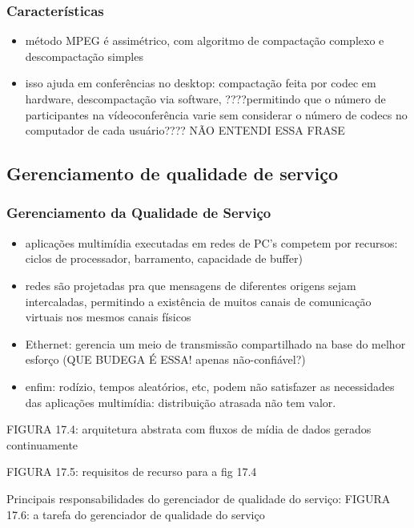 \documentclass[]{beamer}
\begin{document}
\begin{frame}
  \frametitle{Características}
\begin{itemize}
  \item método MPEG é assimétrico, com algoritmo de compactação complexo e descompactação
simples
  \item isso ajuda em conferências no desktop: compactação feita por codec em hardware, 
descompactação via software, ????permitindo que o número de participantes na
vídeoconferência varie sem considerar o número de 
codecs no computador de cada usuário???? NÃO ENTENDI ESSA FRASE
\end{itemize}
\end{frame}

\subsection{Gerenciamento de qualidade de serviço}

\begin{frame}
  \frametitle{Gerenciamento da Qualidade de Serviço}
\begin{itemize}
  \item aplicações multimídia executadas em redes de PC's competem por recursos: ciclos 
de processador, barramento, capacidade de buffer)
  \item redes são projetadas pra que mensagens de diferentes origens sejam intercaladas,
permitindo a existência de muitos canais de comunicação virtuais nos mesmos canais físicos
  \item Ethernet: gerencia um meio de transmissão compartilhado na base do melhor esforço
(QUE BUDEGA É ESSA! apenas não-confiável?)
  \item enfim: rodízio, tempos aleatórios, etc, podem não satisfazer as necessidades das
aplicações multimídia: distribuição atrasada não tem valor.
\end{itemize}
\end{frame}

\begin{frame}
FIGURA 17.4: arquitetura abstrata com fluxos de mídia de dados gerados continuamente
\end{frame}

\begin{frame}
FIGURA 17.5: requisitos de recurso para a fig 17.4
\end{frame}

\begin{frame}
Principais responsabilidades do gerenciador de qualidade do serviço:
FIGURA 17.6: a tarefa do gerenciador de qualidade do serviço
\end{frame}
\end{document}
